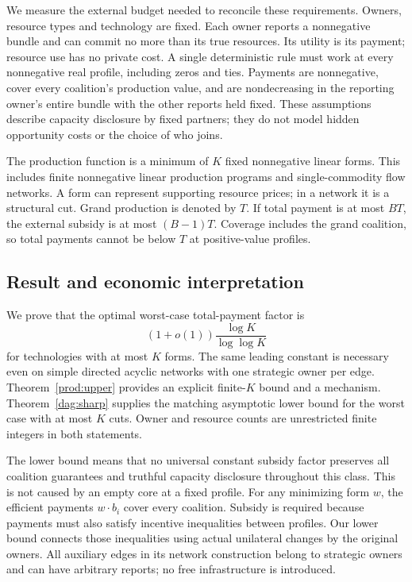 \documentclass[11pt]{article}
\theoremstyle{definition}\newtheorem{definition}[theorem]{Definition}
\theoremstyle{remark}\newtheorem{remark}[theorem]{Remark}
\begin{document}
We measure the external budget needed to reconcile these requirements.
Owners, resource types and technology are fixed. Each owner reports a
nonnegative bundle and can commit no more than its true resources. Its utility
is its payment; resource use has no private cost. A single deterministic rule
must work at every nonnegative real profile, including zeros and ties. Payments
are nonnegative, cover every coalition's production value, and are
nondecreasing in the reporting owner's entire bundle with the other reports
held fixed. These assumptions describe capacity disclosure by fixed partners;
they do not model hidden opportunity costs or the choice of who joins.

The production function is a minimum of $K$ fixed nonnegative linear forms.
This includes finite nonnegative linear production programs and
single-commodity flow networks. A form can represent supporting resource
prices; in a network it is a structural cut. Grand production is denoted by
$T$. If total payment is at most $BT$, the external subsidy is at most
$(B-1)T$. Coverage includes the grand coalition, so total payments cannot
be below $T$ at positive-value profiles.

\subsection{Result and economic interpretation}
We prove that the optimal worst-case total-payment factor is
\[
 (1+o(1))\frac{\log K}{\log\log K}
\]
for technologies with at most $K$ forms. The same leading constant is necessary
even on simple directed acyclic networks with one strategic owner per edge.
Theorem~\ref{prod:upper} provides an explicit finite-$K$ bound and a mechanism.
Theorem~\ref{dag:sharp} supplies the matching asymptotic lower bound for the
worst case with at most $K$ cuts. Owner and resource counts are unrestricted
finite integers in both statements.

The lower bound means that no universal constant subsidy factor preserves
all coalition guarantees and truthful capacity disclosure throughout this
class. This is not caused by an empty core at a fixed profile. For any
minimizing form $w$, the efficient payments $w\cdot b_i$ cover every
coalition. Subsidy is required because payments must also satisfy incentive
inequalities between profiles. Our lower bound connects those inequalities
using actual unilateral changes by the original owners. All auxiliary edges
in its network construction belong to strategic owners and can have arbitrary
reports; no free infrastructure is introduced.
\end{document}
